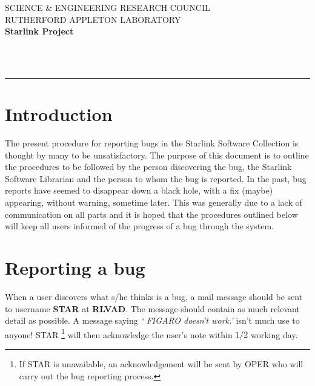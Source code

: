 \thispagestyle{empty}
SCIENCE \& ENGINEERING RESEARCH COUNCIL \hfill \stardocname\\
RUTHERFORD APPLETON LABORATORY\\
{\large\bf Starlink Project\\}
{\large\bf \stardoccategory\ \stardocnumber}
\begin{flushright}
\stardocauthors\\
\stardocdate
\end{flushright}
\vspace{-4mm}
\rule{\textwidth}{0.5mm}
\vspace{5mm}
\begin{center}
{\Large\bf \stardoctitle}
\end{center}
\vspace{5mm}


\section{Introduction}
The present procedure for reporting bugs in the Starlink Software Collection is
thought by many to be unsatisfactory. The purpose of this document is to outline
the procedures to be followed by the person discovering the bug, the Starlink 
Software Librarian and the person to whom the bug is reported. In the past,
bug reports have seemed to disappear down a black hole, with a fix (maybe)
appearing, without warning, sometime later. This was generally due to a lack of 
communication on all parts and it is hoped that the procedures outlined below
will keep all users informed of the progress of a bug through the system.

\section{Reporting a bug}
When a user discovers what s/he thinks is a bug, a mail message should be
sent to username {\bf STAR} at {\bf RLVAD}. The message should contain as much
relevant detail as possible. A message saying {\it ` FIGARO doesn't work.'}
isn't much use to anyone! STAR \footnote[1]{If STAR is unavailable, an
acknowledgement will be sent by OPER who will carry out the bug reporting
process.} will then acknowledge the user's note within $1/2$ working day.

